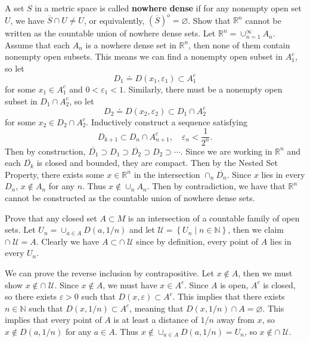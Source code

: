 \documentclass[10pt]{amsart}
\theoremstyle{plain}
\newenvironment{exercise}[1]{%
  \renewcommand\themanualtheoreminner{#1}%
  \manualtheoreminner
}{\endmanualtheoreminner}
\theoremstyle{definition}
\begin{document}
\begin{exercise}{3.33}
	A set $S$ in a metric space is called \textbf{nowhere dense} if for any nonempty open set $U$, we have $\overline{S}\cap U \neq U$, or equivalently, $(\overline{S})^o = \varnothing$. Show that $\mathbb{R}^n$ cannot be written as the countable union of nowhere dense sets.
	\hrulefill
\end{exercise}
Let $\mathbb{R}^n = \cup_{n=1}^\infty A_n$. Assume that each $A_n$ is a nowhere dense set in $\mathbb{R}^n$, then none of them contain nonempty open subsets. This means we can find a nonempty open subset in $A_1^c$, so let
\[
	D_1 \doteq D(x_1, \varepsilon_1) \subset A_1^c
\] 
for some $x_1 \in A_1^c$ and $0<\varepsilon_1<1$. Similarly, there must be a nonempty open subset in $D_1 \cap A_2^c$, so let
\[
	D_2 \doteq D(x_2, \varepsilon_2) \subset D_1 \cap A_2^c
\] 
for some $x_2 \in D_2 \cap A_2^c$. Inductively construct a sequence satisfying
\[
D_{k+1} \subset D_{n} \cap A_{n+1}^c, \quad \varepsilon_{n}<\frac{1}{2^n}. 
\] 
Then by construction, $\overline{D_1}\supset D_1 \supset \overline{D_2} \supset D_2 \supset \cdots$. Since we are working in $\mathbb{R}^n$ and each $\overline{D_k}$ is closed and bounded, they are compact. Then by the Nested Set Property, there exists some $x \in \mathbb{R}^n$ in the intersection $\cap_n \overline{D_n}$. Since $x$ lies in every $D_n$, $x \not\in A_n$ for any $n$. Thus $x \not\in \cup_n A_n$. Then by contradiction, we have that $\mathbb{R}^n$ cannot be constructed as the countable union of nowhere dense sets.

\begin{exercise}{3.34}
	Prove that any closed set $A \subset M$ is an intersection of a countable family of open sets.
	\hrulefill
\end{exercise}
Let $U_n = \cup_{a\in A}D(a,1/n)$ and let $\mathcal{U}=\left\{ U_n \;|\; n\in \mathbb{N} \right\}$, then we claim $\cap\;\mathcal{U} =A$. Clearly we have $A \subset \cap\;\mathcal{U}$ since by definition, every point of $A$ lies in every $U_n$.

We can prove the reverse inclusion by contrapositive. Let $x \not\in A$, then we must show $x \not\in \cap\;\mathcal{U}$. Since $x \not\in A$, we must have $x \in A^c$. Since $A$ is open, $A^c$ is closed, so there exists $\varepsilon>0$ such that $D(x,\varepsilon) \subset A^c$. This implies that there exists $n \in \mathbb{N}$ such that $D(x,1/n) \subset A^c$, meaning that $D(x,1/n) \cap A = \varnothing$. This implies that every point of $A$ is at least a distance of $1/n$ away from $x$, so $x \not\in D(a,1/n)$ for any $a \in A$. Thus $x \not\in \cup_{a\in A}D(a,1/n) = U_n$, so $x \not\in \cap\;\mathcal{U}$.
\end{document}
